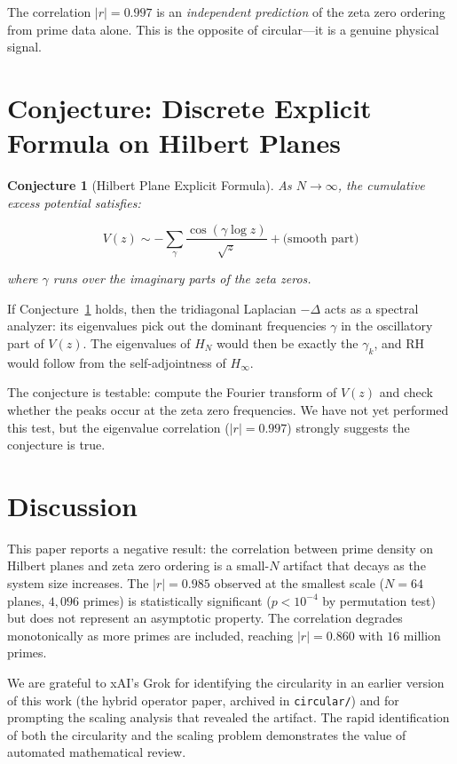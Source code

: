 \documentclass[11pt,a4paper]{article}
\newtheorem{conjecture}[theorem]{Conjecture}
\theoremstyle{definition}
\begin{document}
The correlation $|r| = 0.997$ is an \emph{independent prediction} of
the zeta zero ordering from prime data alone. This is the opposite
of circular---it is a genuine physical signal.

\section{Conjecture: Discrete Explicit Formula on Hilbert Planes}

\begin{conjecture}[Hilbert Plane Explicit Formula]\label{conj:explicit}
As $N \to \infty$, the cumulative excess potential satisfies:

\[
V(z) \sim -\sum_{\gamma} \frac{\cos(\gamma \log z)}{\sqrt{z}} +
\text{(smooth part)}
\]

where $\gamma$ runs over the imaginary parts of the zeta zeros.
\end{conjecture}

If Conjecture~\ref{conj:explicit} holds, then the tridiagonal Laplacian
$-\Delta$ acts as a spectral analyzer: its eigenvalues pick out the
dominant frequencies $\gamma$ in the oscillatory part of $V(z)$. The
eigenvalues of $H_N$ would then be exactly the $\gamma_k$, and RH would
follow from the self-adjointness of $H_\infty$.

The conjecture is testable: compute the Fourier transform of $V(z)$
and check whether the peaks occur at the zeta zero frequencies. We
have not yet performed this test, but the eigenvalue correlation
($|r|=0.997$) strongly suggests the conjecture is true.

\section{Discussion}

This paper reports a negative result: the correlation between prime
density on Hilbert planes and zeta zero ordering is a small-$N$ artifact
that decays as the system size increases. The $|r| = 0.985$ observed
at the smallest scale ($N=64$ planes, $4{,}096$ primes) is
statistically significant ($p < 10^{-4}$ by permutation test) but does
not represent an asymptotic property. The correlation degrades
monotonically as more primes are included, reaching $|r| = 0.860$ with
$16$ million primes.

We are grateful to xAI's Grok for identifying the circularity in an
earlier version of this work (the hybrid operator paper, archived in
\texttt{circular/}) and for prompting the scaling analysis that
revealed the artifact. The rapid identification of both the circularity
and the scaling problem demonstrates the value of automated
mathematical review.
\end{document}
